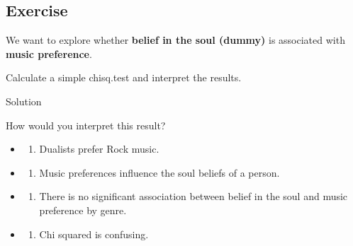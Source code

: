 \documentclass[
]{book}
\newenvironment{Shaded}{\begin{snugshade}}{\end{snugshade}}
\newcommand{\CommentTok}[1]{\textcolor[rgb]{0.56,0.35,0.01}{\textit{#1}}}
\newcommand{\FunctionTok}[1]{\textcolor[rgb]{0.13,0.29,0.53}{\textbf{#1}}}
\newcommand{\NormalTok}[1]{#1}
\newcommand{\SpecialCharTok}[1]{\textcolor[rgb]{0.81,0.36,0.00}{\textbf{#1}}}
\providecommand{\tightlist}{%
  \setlength{\itemsep}{0pt}\setlength{\parskip}{0pt}}
\begin{document}
\subsection{\texorpdfstring{Exercise }{Exercise  }}\label{exercise-3}

We want to explore whether \textbf{belief in the soul (dummy)} is associated with \textbf{music preference}.

Calculate a simple chisq.test and interpret the results.

Solution

\begin{Shaded}
\end{Shaded}

How would you interpret this result?

\begin{itemize}
\tightlist
\item
  \begin{enumerate}
  \def\labelenumi{(\Alph{enumi})}
  \tightlist
  \item
    Dualists prefer Rock music.\\
  \end{enumerate}
\item
  \begin{enumerate}
  \def\labelenumi{(\Alph{enumi})}
  \setcounter{enumi}{1}
  \tightlist
  \item
    Music preferences influence the soul beliefs of a person.\\
  \end{enumerate}
\item
  \begin{enumerate}
  \def\labelenumi{(\Alph{enumi})}
  \setcounter{enumi}{2}
  \tightlist
  \item
    There is no significant association between belief in the soul and music preference by genre.\\
  \end{enumerate}
\item
  \begin{enumerate}
  \def\labelenumi{(\Alph{enumi})}
  \setcounter{enumi}{3}
  \tightlist
  \item
    Chi squared is confusing.
  \end{enumerate}
\end{itemize}
\end{document}
